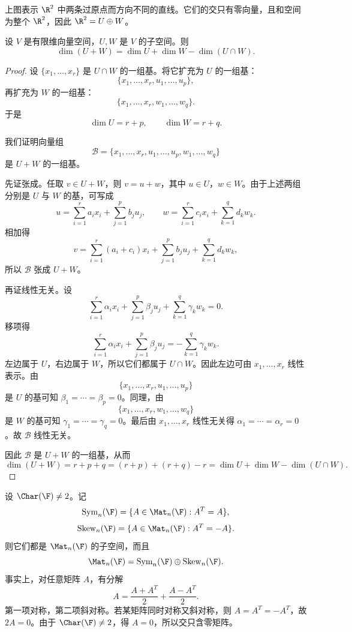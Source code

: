 \begin{center}
\end{center}

上图表示 $\R^2$ 中两条过原点而方向不同的直线。它们的交只有零向量，且和空间为整个 $\R^2$，因此 $\R^2=U\oplus W$。

\begin{theorem}[维数公式]
设 $V$ 是有限维向量空间，$U,W$ 是 $V$ 的子空间。则
\[
\dim(U+W)=\dim U+\dim W-\dim(U\cap W).
\]
\end{theorem}

\begin{proof}
设 $\{x_1,\dots,x_r\}$ 是 $U\cap W$ 的一组基。将它扩充为 $U$ 的一组基：
\[
\{x_1,\dots,x_r,u_1,\dots,u_p\},
\]
再扩充为 $W$ 的一组基：
\[
\{x_1,\dots,x_r,w_1,\dots,w_q\}.
\]
于是
\[
\dim U=r+p,\qquad \dim W=r+q.
\]

我们证明向量组
\[
\mathcal B=\{x_1,\dots,x_r,u_1,\dots,u_p,w_1,\dots,w_q\}
\]
是 $U+W$ 的一组基。

先证张成。任取 $v\in U+W$，则 $v=u+w$，其中 $u\in U$，$w\in W$。由于上述两组分别是 $U$ 与 $W$ 的基，可写成
\[
u=\sum_{i=1}^r a_i x_i+\sum_{j=1}^p b_j u_j,
\qquad
w=\sum_{i=1}^r c_i x_i+\sum_{k=1}^q d_k w_k.
\]
相加得
\[
v=\sum_{i=1}^r (a_i+c_i)x_i+\sum_{j=1}^p b_j u_j+\sum_{k=1}^q d_k w_k,
\]
所以 $\mathcal B$ 张成 $U+W$。

再证线性无关。设
\[
\sum_{i=1}^r \alpha_i x_i+\sum_{j=1}^p \beta_j u_j+\sum_{k=1}^q \gamma_k w_k=0.
\]
移项得
\[
\sum_{i=1}^r \alpha_i x_i+\sum_{j=1}^p \beta_j u_j
=
-\sum_{k=1}^q \gamma_k w_k.
\]
左边属于 $U$，右边属于 $W$，所以它们都属于 $U\cap W$。因此左边可由 $x_1,\dots,x_r$ 线性表示。由
\[
\{x_1,\dots,x_r,u_1,\dots,u_p\}
\]
是 $U$ 的基可知 $\beta_1=\cdots=\beta_p=0$。同理，由
\[
\{x_1,\dots,x_r,w_1,\dots,w_q\}
\]
是 $W$ 的基可知 $\gamma_1=\cdots=\gamma_q=0$。最后由 $x_1,\dots,x_r$ 线性无关得 $\alpha_1=\cdots=\alpha_r=0$。故 $\mathcal B$ 线性无关。

因此 $\mathcal B$ 是 $U+W$ 的一组基，从而
\[
\dim(U+W)=r+p+q=(r+p)+(r+q)-r=\dim U+\dim W-\dim(U\cap W).
\]
\end{proof}

\begin{example}[对称矩阵与斜对称矩阵]
设 $\Char(\F)\ne 2$。记
\[
\mathrm{Sym}_n(\F)=\{A\in\Mat_n(\F):A^T=A\},
\]
\[
\mathrm{Skew}_n(\F)=\{A\in\Mat_n(\F):A^T=-A\}.
\]
则它们都是 $\Mat_n(\F)$ 的子空间，而且
\[
\Mat_n(\F)=\mathrm{Sym}_n(\F)\oplus \mathrm{Skew}_n(\F).
\]
事实上，对任意矩阵 $A$，有分解
\[
A=\frac{A+A^T}{2}+\frac{A-A^T}{2}.
\]
第一项对称，第二项斜对称。若某矩阵同时对称又斜对称，则 $A=A^T=-A^T$，故 $2A=0$。由于 $\Char(\F)\ne 2$，得 $A=0$，所以交只含零矩阵。
\end{example}

